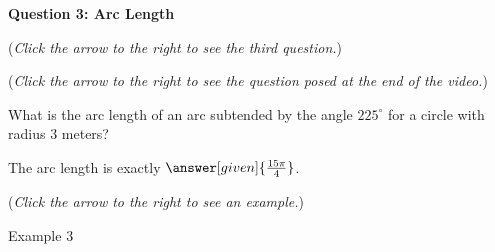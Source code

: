 \documentclass{ximera}
\begin{document}
\textbf{Question 3: Arc Length}
\begin{question}
\begin{flushright}
{\color{blue}(\emph{Click the arrow to the right to see the third question.})}
\end{flushright}
\begin{center}
\begin{expandable}
\begin{flushright}
{\color{blue}(\emph{Click the arrow to the right to see the question
posed at the end of the video.})}
\end{flushright}
\begin{expandable}
What is the arc length of an arc subtended by the angle $225^\circ$
for a circle with radius $3$ meters?\\
\begin{prompt}
The arc length is exactly $\answer[given]{\frac{15\pi}{4}}$.
\end{prompt}
\begin{flushright}
{\color{blue}(\emph{Click the arrow to the right to see an example.})}
\end{flushright}
\begin{expandable}
\begin{center}
Example 3
\end{center}
\end{expandable}
\end{expandable}
\end{expandable}
\end{center}
\end{question}
\end{document}
